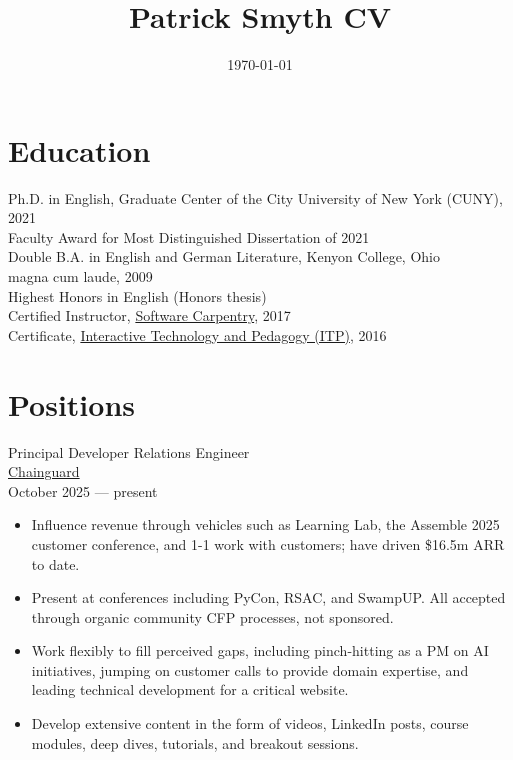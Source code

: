 \documentclass[11pt]{article}
\date{\today}
\title{Patrick Smyth CV}
\begin{document}
\maketitle
\section*{Education}
\label{sec:org60db9d6}
Ph.D. in English, Graduate Center of the City University of New York (CUNY), 2021\\[0pt]
    Faculty Award for Most Distinguished Dissertation of 2021\\[0pt]



Double B.A. in English and German Literature, Kenyon College, Ohio\\[0pt]
	magna cum laude, 2009\\[0pt]
	Highest Honors in English (Honors thesis)\\[0pt]

Certified Instructor, \href{https://carpentries.org/about-us/\#our-mission}{Software Carpentry}, 2017\\[0pt]

Certificate, \href{https://www.gc.cuny.edu/Page-Elements/Academics-Research-Centers-Initiatives/Certificate-Programs/Interactive-Technology-and-Pedagogy}{Interactive Technology and Pedagogy (ITP)}, 2016\\[0pt]

\section*{Positions}
\label{sec:orgfb34a5e}

Principal Developer Relations Engineer\\[0pt]
\href{https://www.chainguard.dev/}{Chainguard}\\[0pt]
October 2025 — present\\[0pt]

\begin{itemize}
\item Influence revenue through vehicles such as Learning Lab, the Assemble 2025 customer conference, and 1-1 work with customers; have driven \$16.5m ARR to date.\\[0pt]
\item Present at conferences including PyCon, RSAC, and SwampUP. All accepted through organic community CFP processes, not sponsored.\\[0pt]
\item Work flexibly to fill perceived gaps, including pinch-hitting as a PM on AI initiatives, jumping on customer calls to provide domain expertise, and leading technical development for a critical website.\\[0pt]
\item Develop extensive content in the form of videos, LinkedIn posts, course modules, deep dives, tutorials, and breakout sessions.\\[0pt]
\end{itemize}
\end{document}
